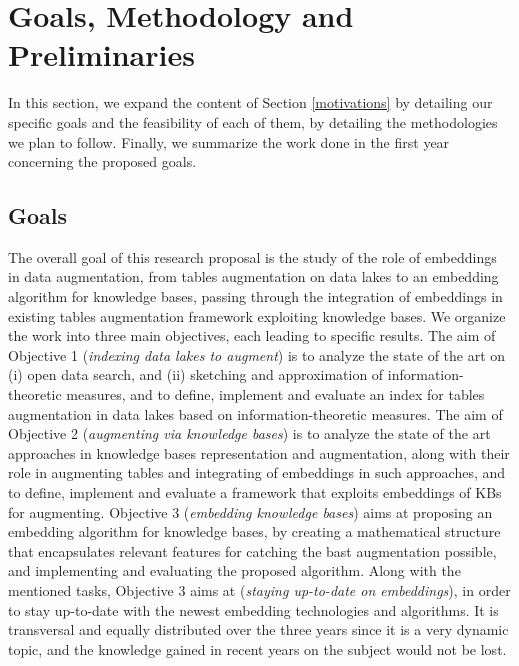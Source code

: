 \section{Goals, Methodology and Preliminaries}\label{goals}

In this section, we expand the content of Section \ref{motivations} by detailing our specific goals and the feasibility of each of them, by detailing the methodologies we plan to follow. Finally, we summarize the work done in the first year concerning the proposed goals.


\subsection{Goals}\label{sub_goals}

The overall goal of this research proposal is the study of the role of embeddings in data augmentation, from tables augmentation on data lakes to an embedding algorithm for knowledge bases, passing through the integration of embeddings in existing tables augmentation framework exploiting knowledge bases. We organize the work into three main objectives, each leading to specific results. 
The aim of Objective 1 (\textit{indexing data lakes to augment}) is to analyze the state of the art on (i) open data search, and (ii) sketching and approximation of information-theoretic measures, and to define, implement and evaluate an index for tables augmentation in data lakes based on information-theoretic measures. 
The aim of Objective 2 (\textit{augmenting via knowledge bases}) is to analyze the state of the art approaches in knowledge bases representation and augmentation, along with their role in augmenting tables and integrating of embeddings in such approaches, and to define, implement and evaluate a framework that exploits embeddings of KBs for augmenting. 
Objective 3 (\textit{embedding knowledge bases}) aims at proposing an embedding algorithm for knowledge bases, by creating a mathematical structure that encapsulates relevant features for catching the bast augmentation possible, and implementing and evaluating the proposed algorithm. Along with the mentioned tasks, Objective 3 aims at (\textit{staying up-to-date on embeddings}), in order to stay up-to-date with the newest embedding technologies and algorithms. It is transversal and equally distributed over the three years since it is a very dynamic topic, and the knowledge gained in recent years on the subject would not be lost.  

